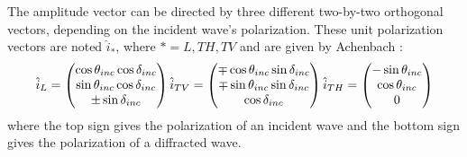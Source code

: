 The amplitude vector can be directed by three different two-by-two orthogonal vectors, depending on the incident wave's polarization. These unit polarization vectors are noted $\hat{i}_*$, where $*=L, TH, TV$ and are given by Achenbach \cite{Achenbach} :
\begin{equation}
\hat{i}_L = \begin{pmatrix}
\cos\theta_{inc} \cos \delta_{inc} \\ \sin\theta_{inc} \cos \delta_{inc} \\
\pm \sin \delta_{inc}
\end{pmatrix}
\hfill
\hfill
\hat{i}_{TV} = \begin{pmatrix}
\mp\cos\theta_{inc} \sin \delta_{inc} \\ \mp\sin\theta_{inc} \sin \delta_{inc} \\
\cos \delta_{inc}
\end{pmatrix}
\hfill
\hfill
\hat{i}_{TH} = \begin{pmatrix}
-\sin\theta_{inc} \\ \cos\theta_{inc} \\
0
\end{pmatrix}
\label{C4:ivec}
\end{equation}
where the top sign gives the polarization of an incident wave and the bottom sign gives the polarization of a diffracted wave.

